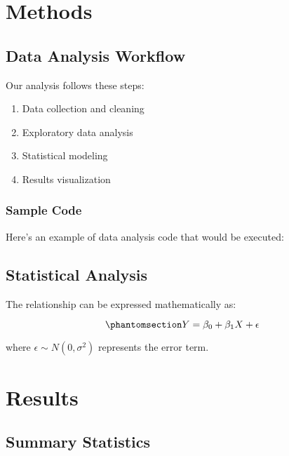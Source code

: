 \documentclass[
  11pt,
]{article}
\providecommand{\tightlist}{%
  \setlength{\itemsep}{0pt}\setlength{\parskip}{0pt}}
\begin{document}
\section{Methods}\label{sec-methods}

\subsection{Data Analysis Workflow}\label{data-analysis-workflow}

Our analysis follows these steps:

\begin{enumerate}
\def\labelenumi{\arabic{enumi}.}
\tightlist
\item
  Data collection and cleaning
\item
  Exploratory data analysis\\
\item
  Statistical modeling
\item
  Results visualization
\end{enumerate}

\subsubsection{Sample Code}\label{sample-code}

Here's an example of data analysis code that would be executed:

\subsection{Statistical Analysis}\label{statistical-analysis}

The relationship can be expressed mathematically as:

\begin{equation}\phantomsection\label{eq-regression}{
Y = \beta_0 + \beta_1 X + \epsilon
}\end{equation}

where \(\epsilon \sim N(0, \sigma^2)\) represents the error term.

\section{Results}\label{sec-results}

\subsection{Summary Statistics}\label{summary-statistics}
\end{document}
